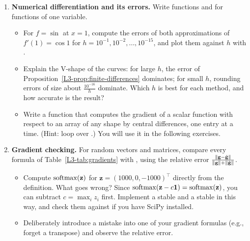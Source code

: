 \begin{enumerate}[label=\textbf{P\arabic*.}, leftmargin=*]
    \item \textbf{Numerical differentiation and its errors.} Write functions  and  for functions of one variable.
    \begin{itemize}
        \item For $f = \sin$ at $x = 1$, compute the errors of both approximations of $f'(1) = \cos 1$ for $h = 10^{-1}, 10^{-2}, \ldots, 10^{-15}$, and plot them against $h$ with .
        \item Explain the V-shape of the curves: for large $h$, the error of Proposition~\ref{L3-prop:finite-differences} dominates; for small $h$, rounding errors of size about $\frac{10^{-16}}{h}$ dominate. Which $h$ is best for each method, and how accurate is the result?
        \item Write a function  that computes the gradient of a scalar function  with respect to an array  of any shape by central differences, one entry at a time. (Hint: loop over .) You will use it in the following exercises.
    \end{itemize}

    \item \textbf{Gradient checking.} For random vectors and matrices, compare every formula of Table~\ref{L3-tab:gradients} with , using the relative error $\frac{\lVert \mathbf{g} - \tilde{\mathbf{g}} \rVert}{\lVert \mathbf{g} \rVert + \lVert \tilde{\mathbf{g}} \rVert}$.
    \begin{itemize}
        \item Compute $\operatorname{softmax}(\mathbf{z})$ for $\mathbf{z} = (1000, 0, -1000)^\top$ directly from the definition. What goes wrong? Since $\operatorname{softmax}(\mathbf{z} - c\mathbf{1}) = \operatorname{softmax}(\mathbf{z})$, you can subtract $c = \max_i z_i$ first. Implement a stable  and a stable  in this way, and check them against  if you have SciPy installed.
        \item Deliberately introduce a mistake into one of your gradient formulas (e.g., forget a transpose) and observe the relative error.
    \end{itemize}


\end{enumerate}
